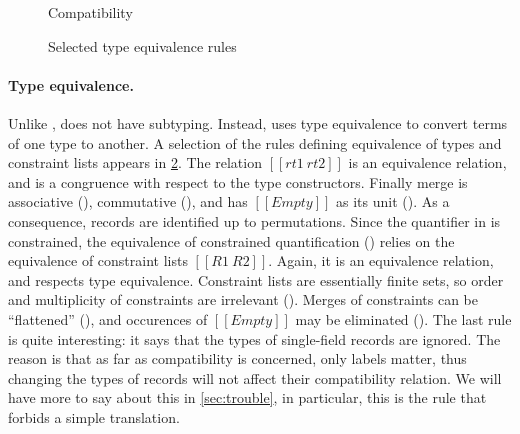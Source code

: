 

\begin{figure}[t]
  \centering
{}
\caption{Compatibility}
\label{fig:compatible}

\end{figure}

\begin{figure}[t]
  \centering
{}
\caption{Selected type equivalence rules}
\label{fig:type_equivalence}
\end{figure}

\paragraph{Type equivalence.}

Unlike \fnamee, \rname does not have subtyping. Instead, \rname uses type
equivalence to convert terms of one type to another. A selection of the rules
defining equivalence of types and constraint lists appears in
\cref{fig:type_equivalence}. The relation $[[rt1 ~ rt2]]$ is an
equivalence relation, and is a congruence with respect to the type constructors.
Finally merge is associative (), commutative
(), and has $[[Empty]]$ as its unit ().
As a consequence, records are identified up to permutations. Since the
quantifier in \rname is constrained, the equivalence of constrained
quantification () relies on the equivalence of constraint
lists $[[R1 ~ R2]]$. Again, it is an equivalence relation, and respects
type equivalence. Constraint lists are essentially finite sets, so order and
multiplicity of constraints are irrelevant (). Merges of
constraints can be ``flattened'' (), and occurences of
$[[Empty]]$ may be eliminated (). The last rule 
is quite interesting: it says that the types of single-field records are
ignored. The reason is that as far as compatibility is concerned, only labels
matter, thus changing the types of records will not affect their compatibility
relation. We will have more to say about this in \cref{sec:trouble}, in
particular, this is the rule that forbids a simple translation.

